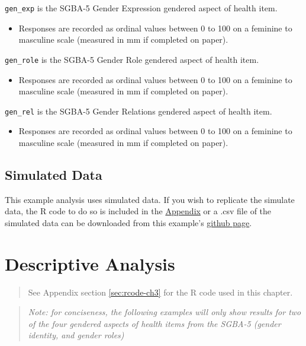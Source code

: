 \documentclass[
]{book}
\providecommand{\tightlist}{%
  \setlength{\itemsep}{0pt}\setlength{\parskip}{0pt}}
\begin{document}
\texttt{gen\_exp} is the SGBA-5 Gender Expression gendered aspect of health item.

\begin{itemize}
\tightlist
\item
  Responses are recorded as ordinal values between 0 to 100 on a feminine to masculine scale (measured in mm if completed on paper).
\end{itemize}

\texttt{gen\_role} is the SGBA-5 Gender Role gendered aspect of health item.

\begin{itemize}
\tightlist
\item
  Responses are recorded as ordinal values between 0 to 100 on a feminine to masculine scale (measured in mm if completed on paper).
\end{itemize}

\texttt{gen\_rel} is the SGBA-5 Gender Relations gendered aspect of health item.

\begin{itemize}
\tightlist
\item
  Responses are recorded as ordinal values between 0 to 100 on a feminine to masculine scale (measured in mm if completed on paper).
\end{itemize}

\section{Simulated Data}\label{simulated-data}

This example analysis uses simulated data. If you wish to replicate the simulate data, the R code to do so is included in the \hyperref[sec:sim-data]{Appendix} or a .csv file of the simulated data can be downloaded from this example's \href{https://github.com/putman-a/SGBA-5_example_analysis/\%s}{github page}.

\chapter{Descriptive Analysis}\label{descriptive-analysis}

\begin{quote}
See Appendix section \ref{sec:rcode-ch3} for the R code used in this chapter.
\end{quote}

\begin{quote}
\emph{Note: for conciseness, the following examples will only show results for two of the four gendered aspects of health items from the SGBA-5 (gender identity, and gender roles)}
\end{quote}
\end{document}
